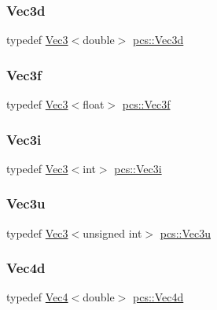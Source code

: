 \subsubsection{\texorpdfstring{Vec3d}{Vec3d}}
{\footnotesize\ttfamily typedef \hyperlink{structpcs_1_1Vec3}{Vec3}$<$double$>$ \hyperlink{namespacepcs_ad162884a2f34ac8048b26b5393a41981}{pcs\+::\+Vec3d}}

\mbox{\label{namespacepcs_a68e0f517680976c17c810ffe6952cbab}} 
\subsubsection{\texorpdfstring{Vec3f}{Vec3f}}
{\footnotesize\ttfamily typedef \hyperlink{structpcs_1_1Vec3}{Vec3}$<$float$>$ \hyperlink{namespacepcs_a68e0f517680976c17c810ffe6952cbab}{pcs\+::\+Vec3f}}

\mbox{\label{namespacepcs_a90c0b9d4184dcb79e95ac2ce79287614}} 
\subsubsection{\texorpdfstring{Vec3i}{Vec3i}}
{\footnotesize\ttfamily typedef \hyperlink{structpcs_1_1Vec3}{Vec3}$<$int$>$ \hyperlink{namespacepcs_a90c0b9d4184dcb79e95ac2ce79287614}{pcs\+::\+Vec3i}}

\mbox{\label{namespacepcs_a2fb79528e302be33c240f71df13454ac}} 
\subsubsection{\texorpdfstring{Vec3u}{Vec3u}}
{\footnotesize\ttfamily typedef \hyperlink{structpcs_1_1Vec3}{Vec3}$<$unsigned int$>$ \hyperlink{namespacepcs_a2fb79528e302be33c240f71df13454ac}{pcs\+::\+Vec3u}}

\mbox{\label{namespacepcs_a16e5649fe0d83b923040c93b9895f9c9}} 
\subsubsection{\texorpdfstring{Vec4d}{Vec4d}}
{\footnotesize\ttfamily typedef \hyperlink{structpcs_1_1Vec4}{Vec4}$<$double$>$ \hyperlink{namespacepcs_a16e5649fe0d83b923040c93b9895f9c9}{pcs\+::\+Vec4d}}

